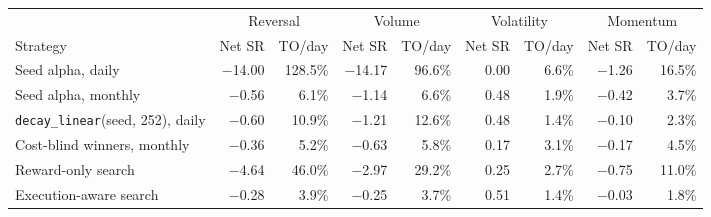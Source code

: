 \begin{tabular}{lrrrrrrrr}
\toprule
 & \multicolumn{2}{c}{Reversal} & \multicolumn{2}{c}{Volume} & \multicolumn{2}{c}{Volatility} & \multicolumn{2}{c}{Momentum} \\
\cmidrule(lr){2-3}\cmidrule(lr){4-5}\cmidrule(lr){6-7}\cmidrule(lr){8-9}
Strategy & Net SR & TO/day & Net SR & TO/day & Net SR & TO/day & Net SR & TO/day \\
\midrule
Seed alpha, daily & $-$14.00 & 128.5\% & $-$14.17 & 96.6\% & 0.00 & 6.6\% & $-$1.26 & 16.5\% \\
Seed alpha, monthly & $-$0.56 & 6.1\% & $-$1.14 & 6.6\% & 0.48 & 1.9\% & $-$0.42 & 3.7\% \\
\texttt{decay\_linear}(seed, 252), daily & $-$0.60 & 10.9\% & $-$1.21 & 12.6\% & 0.48 & 1.4\% & $-$0.10 & 2.3\% \\
Cost-blind winners, monthly & $-$0.36 & 5.2\% & $-$0.63 & 5.8\% & 0.17 & 3.1\% & $-$0.17 & 4.5\% \\
\midrule
Reward-only search & $-$4.64 & 46.0\% & $-$2.97 & 29.2\% & 0.25 & 2.7\% & $-$0.75 & 11.0\% \\
Execution-aware search & $-$0.28 & 3.9\% & $-$0.25 & 3.7\% & 0.51 & 1.4\% & $-$0.03 & 1.8\% \\
\bottomrule
\end{tabular}
